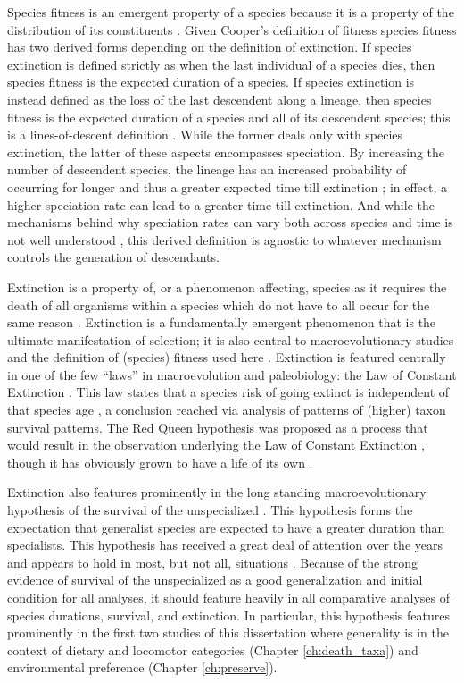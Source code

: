 Species fitness is an emergent property of a species because it is a property of the distribution of its constituents \citep{Jablonski2007}. Given Cooper's definition of fitness \citep{Cooper1984} species fitness has two derived forms depending on the definition of extinction. If species extinction is defined strictly as when the last individual of a species dies, then species fitness is the expected duration of a species. If species extinction is instead defined as the loss of the last descendent along a lineage, then species fitness is the expected duration of a species and all of its descendent species; this is a lines-of-descent definition \citep{Cooper1984}. While the former deals only with species extinction, the latter of these aspects encompasses speciation. By increasing the number of descendent species, the lineage has an increased probability of occurring for longer and thus a greater expected time till extinction \citep{Cooper1984}; in effect, a higher speciation rate can lead to a greater time till extinction. And while the mechanisms behind why speciation rates can vary both across species and time is not well understood \citep{Rabosky2015c,Rabosky2013e,Coyne2004}, this derived definition is agnostic to whatever mechanism controls the generation of descendants. 

Extinction is a property of, or a phenomenon affecting, species as it requires the death of all organisms within a species which do not have to all occur for the same reason \citep{Simpson2016a}. Extinction is a fundamentally emergent phenomenon that is the ultimate manifestation of selection; it is also central to macroevolutionary studies and the definition of (species) fitness used here \citep{Cooper1984}. Extinction is featured centrally in one of the few ``laws'' in macroevolution and paleobiology: the Law of Constant Extinction \citep{VanValen1973,Liow2011a}. This law states that a species risk of going extinct is independent of that species age \citep{VanValen1973,Liow2011a}, a conclusion reached via analysis of patterns of (higher) taxon survival patterns. The Red Queen hypothesis was proposed as a process that would result in the observation underlying the Law of Constant Extinction \citep{VanValen1973}, though it has obviously grown to have a life of its own \citep{Liow2011a}.

Extinction also features prominently in the long standing macroevolutionary hypothesis of the survival of the unspecialized \citep{Simpson1944}. This hypothesis forms the expectation that generalist species are expected to have a greater duration than specialists. This hypothesis has received a great deal of attention over the years and appears to hold in most, but not all, situations \citep{Simpson1944,Liow2004a,Nurnberg2013a,Nurnberg2015,Baumiller1993,Raia2016}. Because of the strong evidence of survival of the unspecialized as a good generalization and initial condition for all analyses, it should feature heavily in all comparative analyses of species durations, survival, and extinction. In particular, this hypothesis features prominently in the first two studies of this dissertation where generality is in the context of dietary and locomotor categories (Chapter \ref{ch:death_taxa}) and environmental preference (Chapter \ref{ch:preserve}). 

